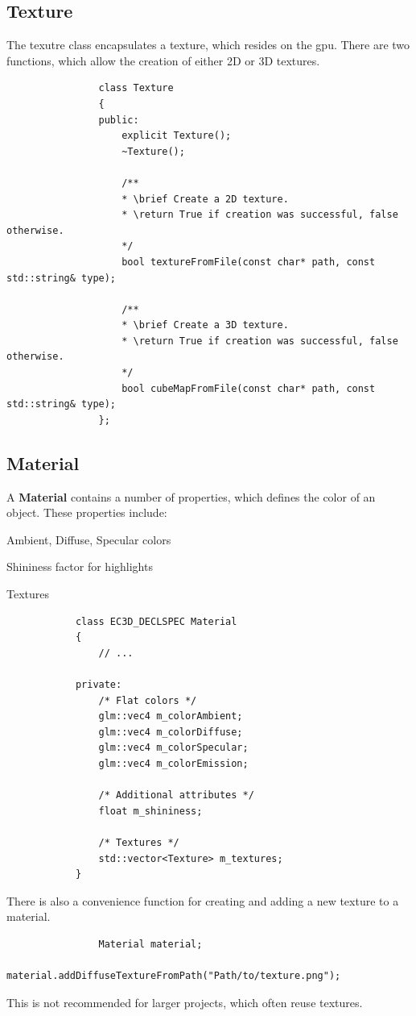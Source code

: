 \documentclass[12p, paper=a4, leqno, colorinlistoftodos]{article}
\newenvironment{packed_itemize}
{\begin{itemize}
		\setlength{\itemsep}{0pt}
		\setlength{\parskip}{0pt}
		\setlength{\parsep}{0pt}
	}{\end{itemize}}
\begin{document}
		\subsection{Texture}
			The texutre class encapsulates a texture, which resides on the gpu. There are two functions, which allow the creation of either 2D or 3D textures.			
			\begin{lstlisting}
				class Texture
				{
				public:
					explicit Texture();
					~Texture();
					
					/**
					* \brief Create a 2D texture.
					* \return True if creation was successful, false otherwise.
					*/
					bool textureFromFile(const char* path, const std::string& type);
					
					/** 
					* \brief Create a 3D texture.
					* \return True if creation was successful, false otherwise.
					*/
					bool cubeMapFromFile(const char* path, const std::string& type);
				};	
			\end{lstlisting}
		
		\subsection{Material}
			A \textbf{Material} contains a number of properties, which defines the color of an object. These properties include:
			\begin{packed_itemize}
				\item Ambient, Diffuse, Specular colors
				\item Shininess factor for highlights
				\item Textures
			\end{packed_itemize}
		
			\begin{lstlisting}
			class EC3D_DECLSPEC Material
			{
				// ...
			
			private:
				/* Flat colors */
				glm::vec4 m_colorAmbient;
				glm::vec4 m_colorDiffuse;
				glm::vec4 m_colorSpecular;
				glm::vec4 m_colorEmission;
				
				/* Additional attributes */
				float m_shininess;
				
				/* Textures */
				std::vector<Texture> m_textures;
			}
			\end{lstlisting}
			
			There is also a convenience function for creating and adding a new texture to a material.
			\begin{lstlisting}
				Material material;
				material.addDiffuseTextureFromPath("Path/to/texture.png");
			\end{lstlisting}
			This is not recommended for larger projects, which often reuse textures.
		
\end{document}
